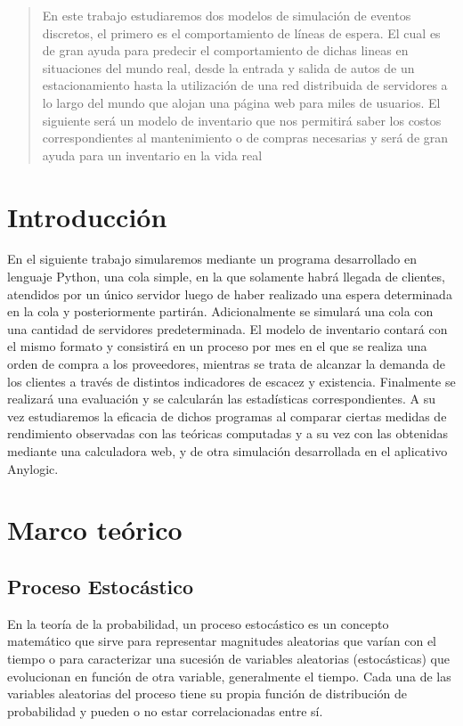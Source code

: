 \begin{abstract}
  En este trabajo estudiaremos dos modelos de simulación de eventos discretos, el primero es el comportamiento
  de líneas de espera. El cual es de gran ayuda para predecir el comportamiento de dichas lineas en
  situaciones del mundo real, desde la entrada y salida de autos de un estacionamiento hasta la utilización
  de una red distribuida de servidores a lo largo del mundo que alojan una página web para miles de usuarios.
  El siguiente será un modelo de inventario que nos permitirá saber los costos correspondientes al mantenimiento
  o de compras necesarias y será de gran ayuda para un inventario en la vida real
\end{abstract}


\section{Introducción}\label{sec:introduccion}
En el siguiente trabajo simularemos mediante un programa desarrollado en lenguaje Python, una cola simple, en la que
solamente habrá llegada de clientes, atendidos por un único servidor luego de haber realizado una espera
determinada en la cola y posteriormente partirán. Adicionalmente se simulará una cola con una cantidad de servidores predeterminada.
El modelo de inventario contará con el mismo formato y consistirá en un proceso por mes en el que se realiza una orden de compra
a los proveedores, mientras se trata de alcanzar la demanda de los clientes a través de distintos indicadores de escacez y
existencia. Finalmente se realizará una evaluación y se calcularán las estadísticas correspondientes.
A su vez estudiaremos la eficacia de dichos programas al comparar ciertas medidas de rendimiento observadas con las
teóricas computadas y a su vez con las obtenidas mediante una calculadora web, y de otra simulación desarrollada
en el aplicativo Anylogic.


\section{Marco teórico}\label{sec:marco-teórico}

\subsection{Proceso Estocástico}\label{subsec:proceso-estocástico}
En la teoría de la probabilidad, un proceso estocástico es un concepto matemático que sirve para representar
magnitudes aleatorias que varían con el tiempo o para caracterizar una sucesión de variables aleatorias (estocásticas)
que evolucionan en función de otra variable, generalmente el tiempo.
Cada una de las variables aleatorias del proceso tiene su propia función de distribución de probabilidad y pueden o no
estar correlacionadas entre sí.

